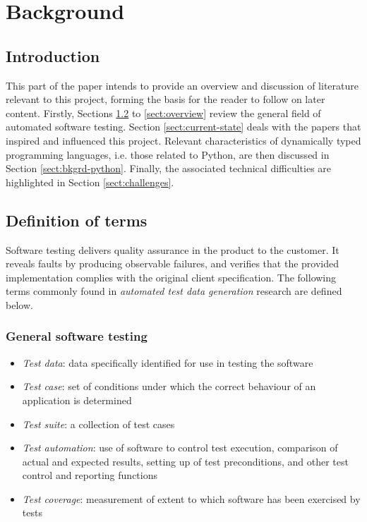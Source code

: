 \documentclass{icldt}
\numberwithin{equation}{section}       %
\newcommand{\blankpage}{
\newpage
\thispagestyle{empty}
\mbox{}
\newpage
}
\begin{document}
	
	
	
	\tableofcontents
	
\chapter{Background}
\label{ch:background}
\section{Introduction}
This part of the paper intends to provide an overview and discussion of literature relevant to this project, forming the basis for the reader to follow on later content. Firstly, Sections \ref{sect:basics} to \ref{sect:overview} review the general field of automated software testing. Section \ref{sect:current-state} deals with the papers that inspired and influenced this project. Relevant characteristics of dynamically typed programming languages, i.e. those related to Python, are then discussed in Section \ref{sect:bkgrd-python}. Finally, the associated technical difficulties are highlighted in Section \ref{sect:challenges}.
\section{Definition of terms}
\label{sect:basics}
Software testing delivers quality assurance in the product to the customer. It reveals faults by producing observable failures, and verifies that the provided implementation complies with the original client specification. The following terms commonly found in \emph{automated test data generation} research are defined below.

\subsection{General software testing}
\begin{itemize}
	\item \emph{Test data}: data specifically identified for use in testing the software
	\item \emph{Test case}: set of conditions under which the correct behaviour of an application is determined
	\item \emph{Test suite}: a collection of test cases
	\item \emph{Test automation}: use of software to control test execution, comparison of actual and expected results, setting up of test preconditions, and other test control and reporting functions
	\item \emph{Test coverage}: measurement of extent to which software has been exercised by tests
\end{itemize}
\end{document}
